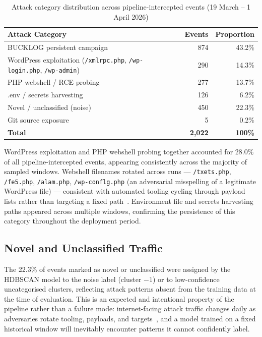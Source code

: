 \documentclass[12pt, a4paper]{report}   %
\begin{document}
\begin{table}[H]
\centering
\caption{Attack category distribution across pipeline-intercepted
events (19 March -- 1 April 2026)}
\label{tab:attack-cats}
\begin{tabular}{lrr}
\hline
\textbf{Attack Category} & \textbf{Events} & \textbf{Proportion} \\
\hline
BUCKLOG persistent campaign
  & 874 & 43.2\% \\
WordPress exploitation (\texttt{/xmlrpc.php},
\texttt{/wp-login.php}, \texttt{/wp-admin})
  & 290 & 14.3\% \\
PHP webshell / RCE probing
  & 277 & 13.7\% \\
.env / secrets harvesting
  & 126 &  6.2\% \\
Novel / unclassified (noise)
  & 450 & 22.3\% \\
Git source exposure
  &   5 &  0.2\% \\
\hline
\textbf{Total} & \textbf{2,022} & \textbf{100\%} \\
\hline
\end{tabular}
\end{table}

WordPress exploitation and PHP webshell probing together
accounted for 28.0\% of all pipeline-intercepted events,
appearing consistently across the majority of sampled windows.
Webshell filenames rotated across runs ---
\texttt{/txets.php}, \texttt{/fe5.php}, \texttt{/alam.php},
\texttt{/wp-conflg.php} (an adversarial misspelling of a
legitimate WordPress file) --- consistent with automated
tooling cycling through payload lists rather than targeting a
fixed path~\cite{exploit-db}. Environment file and secrets
harvesting paths appeared across multiple windows, confirming
the persistence of this category throughout the deployment
period.

\subsection{Novel and Unclassified Traffic}
\label{sec:novel-traffic}

The 22.3\% of events marked as novel or unclassified were
assigned by the HDBSCAN model to the noise label (cluster
$-1$) or to low-confidence uncategorised clusters, reflecting
attack patterns absent from the training data at the time of
evaluation. This is an expected and intentional property of
the pipeline rather than a failure mode: internet-facing
attack traffic changes daily as adversaries rotate tooling,
payloads, and targets~\cite{mitre-recon}, and a model trained
on a fixed historical window will inevitably encounter patterns
it cannot confidently label.
\end{document}

